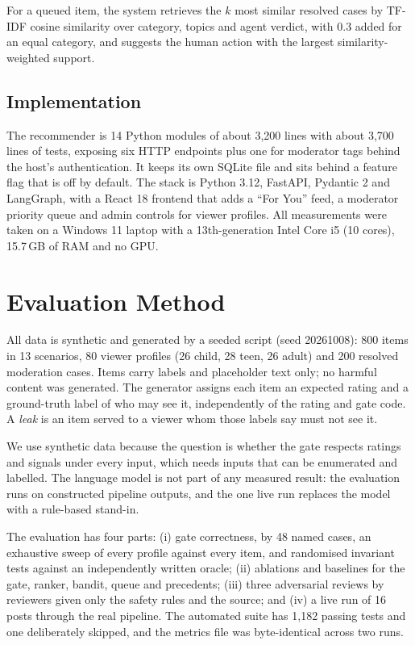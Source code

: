 \documentclass[conference]{IEEEtran}
\begin{document}
For a queued item, the system retrieves the $k$ most similar resolved cases by TF-IDF cosine similarity over category, topics and agent verdict, with 0.3 added for an equal category, and suggests the human action with the largest similarity-weighted support.

\subsection{Implementation}

The recommender is 14 Python modules of about 3,200 lines with about 3,700 lines of tests, exposing six HTTP endpoints plus one for moderator tags behind the host's authentication. It keeps its own SQLite file and sits behind a feature flag that is off by default. The stack is Python 3.12, FastAPI, Pydantic 2 and LangGraph, with a React 18 frontend that adds a ``For You'' feed, a moderator priority queue and admin controls for viewer profiles. All measurements were taken on a Windows 11 laptop with a 13th-generation Intel Core i5 (10 cores), 15.7\,GB of RAM and no GPU.

\section{Evaluation Method}

All data is synthetic and generated by a seeded script (seed 20261008): 800 items in 13 scenarios, 80 viewer profiles (26 child, 28 teen, 26 adult) and 200 resolved moderation cases. Items carry labels and placeholder text only; no harmful content was generated. The generator assigns each item an expected rating and a ground-truth label of who may see it, independently of the rating and gate code. A \emph{leak} is an item served to a viewer whom those labels say must not see it.

We use synthetic data because the question is whether the gate respects ratings and signals under every input, which needs inputs that can be enumerated and labelled. The language model is not part of any measured result: the evaluation runs on constructed pipeline outputs, and the one live run replaces the model with a rule-based stand-in.

The evaluation has four parts: (i) gate correctness, by 48 named cases, an exhaustive sweep of every profile against every item, and randomised invariant tests against an independently written oracle; (ii) ablations and baselines for the gate, ranker, bandit, queue and precedents; (iii) three adversarial reviews by reviewers given only the safety rules and the source; and (iv) a live run of 16 posts through the real pipeline. The automated suite has 1,182 passing tests and one deliberately skipped, and the metrics file was byte-identical across two runs.
\end{document}
